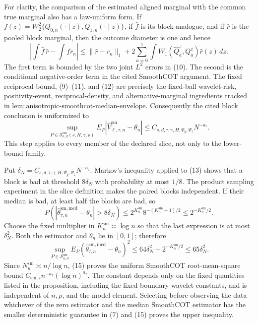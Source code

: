 For clarity, the comparison of the estimated aligned marginal with the common true marginal also has a law-uniform form.  If \(f(z)=W_2^2\{Q_{0,n}(\cdot\mid z),Q_{1,n}(\cdot\mid z)\}\), if \(\widehat f\) is its block analogue, and if \(\widehat r\) is the pooled block marginal, then the outcome diameter is one and hence
\[
\left|\int\widehat f\,\widehat r-\int f r_n\right|
\le\|\widehat r-r_n\|_1
+2\sum_{a=0}^1\int W_1(\widehat Q_a^z,Q_a^z)\widehat r(z)\,dz. \tag{12}
\]
The first term is bounded by the two joint \(L^2\) errors in (10).  The second is the conditional negative-order term in the cited SmoothCOT argument.  The fixed reciprocal bound, (9)--(11), and (12) are precisely the fixed-ball wavelet-risk, positivity-event, reciprocal-density, and alternative-marginal ingredients tracked in \(\mathrm{lem{:}anisotropic\text{-}smoothcot\text{-}median\text{-}envelope}\).  Consequently the cited block conclusion is uniformized to
\[
\sup_{P\in\mathcal S^{\mathrm{sm}}_{n,d}(s,H,\gamma,\rho)}
E_P\left|\widehat V_{\ell,\tau,n}^{\mathrm{sm}}-\theta_n\right|
\le C_{s,d,\tau,\gamma,H,\Psi_y,\Psi_z}N^{-a_\tau}. \tag{13}
\]
This step applies to every member of the declared slice, not only to the lower-bound family.

Put \(\delta_N=C_{s,d,\tau,\gamma,H,\Psi_y,\Psi_z}N^{-a_\tau}\).  Markov's inequality applied to (13) shows that a block is bad at threshold \(8\delta_N\) with probability at most \(1/8\).  The product sampling experiment in the slice definition makes the paired blocks independent.  If their median is bad, at least half the blocks are bad, so
\[
P\!\left(
|\widehat\theta^{\mathrm{sm,med}}_{\tau,n}-\theta_n|>8\delta_N
\right)
\le2^{K_n^{\mathrm{sm}}}8^{-(K_n^{\mathrm{sm}}+1)/2}
\le2^{-K_n^{\mathrm{sm}}/2}. \tag{14}
\]
Choose the fixed multiplier in \(K_n^{\mathrm{sm}}\asymp\log n\) so that the last expression is at most \(\delta_N^2\).  Both the estimator and \(\theta_n\) lie in \([0,1]\); therefore
\[
\sup_{P\in\mathcal S^{\mathrm{sm}}_{n,d}}
E_P(\widehat\theta^{\mathrm{sm,med}}_{\tau,n}-\theta_n)^2
\le64\delta_N^2+2^{-K_n^{\mathrm{sm}}/2}
\le65\delta_N^2. \tag{15}
\]
Since \(N_n^{\mathrm{sm}}\asymp n/\log n\), (15) proves the uniform SmoothCOT root-mean-square bound \(C_{\mathrm{sm},\tau}n^{-a_\tau}(\log n)^{a_\tau}\).  The constant depends only on the fixed quantities listed in the proposition, including the fixed boundary-wavelet constants, and is independent of \(n,\rho\), and the model element.  Selecting before observing the data whichever of the zero estimator and the median SmoothCOT estimator has the smaller deterministic guarantee in (7) and (15) proves the upper inequality.

